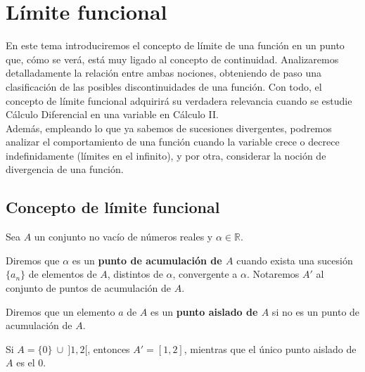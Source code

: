 
\chapter{Límite funcional}

En este tema introduciremos el concepto de límite de una función en un punto que, cómo se verá, está muy ligado al concepto de continuidad. Analizaremos detalladamente la relación entre ambas nociones, obteniendo de paso una clasificación de las posibles discontinuidades de una función. Con todo, el concepto de límite funcional adquirirá su verdadera relevancia cuando se estudie Cálculo Diferencial en una variable en Cálculo II.\\

Además, empleando lo que ya sabemos de sucesiones divergentes, podremos analizar el comportamiento de una función cuando la variable crece o decrece indefinidamente (límites en el infinito), y por otra, considerar la noción de divergencia de una función.


\section{Concepto de límite funcional}
\begin{definicion}
    Sea $A$ un conjunto no vacío de números reales y $\alpha \in \mathbb{R}$.
    
    Diremos que $\alpha$ es un \textbf{punto de acumulación de $A$} cuando exista una sucesión $\{a_n\}$ de elementos de $A$,
    distintos de $\alpha$, convergente a $\alpha$. Notaremos $A'$ al conjunto de puntos de acumulación de $A$.
    
    Diremos que un elemento $a$ de $A$ es un \textbf{punto aislado de $A$} si no es un punto de acumulación de $A$.
\end{definicion}
\begin{ejemplo}
    Si $A = \{0\} ~ \cup ~ ]1,2[$, entonces $A'= [1,2]$, mientras que el único punto aislado de $A$ es el $0$.
\end{ejemplo}

